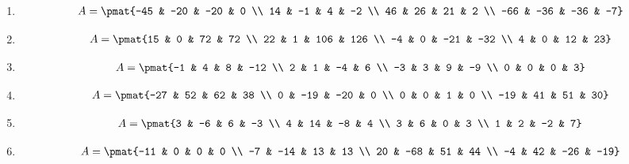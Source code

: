 \begin{enumerate}
\item

\begin{align*}
A = \pmat{-45 & -20 & -20 & 0 \\ 14 & -1 & 4 & -2 \\ 46 & 26 & 21 & 2 \\ -66 & -36 & -36 & -7}
\end{align*}

\item

\begin{align*}
A = \pmat{15 & 0 & 72 & 72 \\ 22 & 1 & 106 & 126 \\ -4 & 0 & -21 & -32 \\ 4 & 0 & 12 & 23}
\end{align*}

\item

\begin{align*}
A = \pmat{-1 & 4 & 8 & -12 \\ 2 & 1 & -4 & 6 \\ -3 & 3 & 9 & -9 \\ 0 & 0 & 0 & 3}
\end{align*}

\item

\begin{align*}
A = \pmat{-27 & 52 & 62 & 38 \\ 0 & -19 & -20 & 0 \\ 0 & 0 & 1 & 0 \\ -19 & 41 & 51 & 30}
\end{align*}

\item

\begin{align*}
A = \pmat{3 & -6 & 6 & -3 \\ 4 & 14 & -8 & 4 \\ 3 & 6 & 0 & 3 \\ 1 & 2 & -2 & 7}
\end{align*}

\item

\begin{align*}
A = \pmat{-11 & 0 & 0 & 0 \\ -7 & -14 & 13 & 13 \\ 20 & -68 & 51 & 44 \\ -4 & 42 & -26 & -19}
\end{align*}


\end{enumerate}
